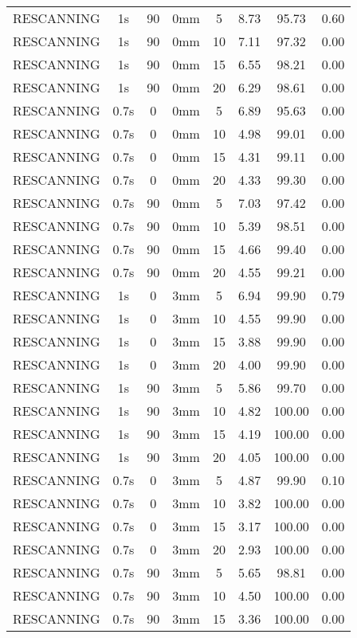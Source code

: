 \begin{table}[H]
\begin{tabular}{|c||c|c|c|c||c|c|c|}
RESCANNING & 1s & 90 & 0mm & 5 & 8.73 & 95.73 & 0.60 \\
RESCANNING & 1s & 90 & 0mm & 10 & 7.11 & 97.32 & 0.00 \\
RESCANNING & 1s & 90 & 0mm & 15 & 6.55 & 98.21 & 0.00 \\
RESCANNING & 1s & 90 & 0mm & 20 & 6.29 & 98.61 & 0.00 \\
RESCANNING & 0.7s & 0 & 0mm & 5 & 6.89 & 95.63 & 0.00 \\
RESCANNING & 0.7s & 0 & 0mm & 10 & 4.98 & 99.01 & 0.00 \\
RESCANNING & 0.7s & 0 & 0mm & 15 & 4.31 & 99.11 & 0.00 \\
RESCANNING & 0.7s & 0 & 0mm & 20 & 4.33 & 99.30 & 0.00 \\
RESCANNING & 0.7s & 90 & 0mm & 5 & 7.03 & 97.42 & 0.00 \\
RESCANNING & 0.7s & 90 & 0mm & 10 & 5.39 & 98.51 & 0.00 \\
RESCANNING & 0.7s & 90 & 0mm & 15 & 4.66 & 99.40 & 0.00 \\
RESCANNING & 0.7s & 90 & 0mm & 20 & 4.55 & 99.21 & 0.00 \\
RESCANNING & 1s & 0 & 3mm & 5 & 6.94 & 99.90 & 0.79 \\
RESCANNING & 1s & 0 & 3mm & 10 & 4.55 & 99.90 & 0.00 \\
RESCANNING & 1s & 0 & 3mm & 15 & 3.88 & 99.90 & 0.00 \\
RESCANNING & 1s & 0 & 3mm & 20 & 4.00 & 99.90 & 0.00 \\
RESCANNING & 1s & 90 & 3mm & 5 & 5.86 & 99.70 & 0.00 \\
RESCANNING & 1s & 90 & 3mm & 10 & 4.82 & 100.00 & 0.00 \\
RESCANNING & 1s & 90 & 3mm & 15 & 4.19 & 100.00 & 0.00 \\
RESCANNING & 1s & 90 & 3mm & 20 & 4.05 & 100.00 & 0.00 \\
RESCANNING & 0.7s & 0 & 3mm & 5 & 4.87 & 99.90 & 0.10 \\
RESCANNING & 0.7s & 0 & 3mm & 10 & 3.82 & 100.00 & 0.00 \\
RESCANNING & 0.7s & 0 & 3mm & 15 & 3.17 & 100.00 & 0.00 \\
RESCANNING & 0.7s & 0 & 3mm & 20 & 2.93 & 100.00 & 0.00 \\
RESCANNING & 0.7s & 90 & 3mm & 5 & 5.65 & 98.81 & 0.00 \\
RESCANNING & 0.7s & 90 & 3mm & 10 & 4.50 & 100.00 & 0.00 \\
RESCANNING & 0.7s & 90 & 3mm & 15 & 3.36 & 100.00 & 0.00 \\

\end{tabular}
\end{table}
